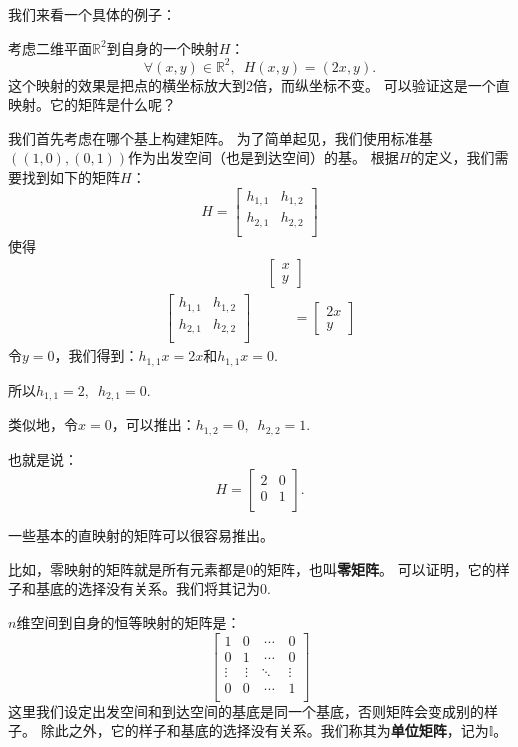 \documentclass[12pt,UTF8,fontset=none]{ctexbook}
\begin{document}
我们来看一个具体的例子：

考虑二维平面$\mathbb{R}^2$到自身的一个映射$H$：
$$ \forall (x, y) \in \mathbb{R}^2, \,\,\, H(x,y) = (2x, y).$$
这个映射的效果是把点的横坐标放大到2倍，而纵坐标不变。
可以验证这是一个直映射。它的矩阵是什么呢？

我们首先考虑在哪个基上构建矩阵。
为了简单起见，我们使用标准基$\left((1,0),(0,1)\right)$作为出发空间（也是到达空间）的基。
根据$H$的定义，我们需要找到如下的矩阵$H$：
$$
H = \begin{bmatrix}
    h_{1,1} & h_{1,2}  \\
    h_{2,1} & h_{2,2}  \\
  \end{bmatrix}
$$
使得
\begin{align*}
&  \,\begin{bmatrix}x\\y\end{bmatrix}  \\
    \begin{bmatrix}
         h_{1,1} & h_{1,2}  \\
         h_{2,1} & h_{2,2}  \\
       \end{bmatrix} \,&\qquad = \begin{bmatrix}2x\\y \end{bmatrix} 
\end{align*}
令$y = 0$，我们得到：$h_{1,1}x = 2x$和$h_{1,1}x = 0$.

所以$h_{1,1} = 2, \,\,\, h_{2,1} = 0.$

类似地，令$x = 0$，可以推出：$h_{1,2} = 0, \,\,\, h_{2,2} = 1.$

也就是说：
$$
H = \begin{bmatrix}
    2 & 0  \\
    0 & 1  \\
  \end{bmatrix}.
$$

一些基本的直映射的矩阵可以很容易推出。

比如，零映射的矩阵就是所有元素都是$0$的矩阵，也叫\textbf{零矩阵}。
可以证明，它的样子和基底的选择没有关系。我们将其记为$0$.

$n$维空间到自身的恒等映射的矩阵是：
$$
\begin{bmatrix}
 1     & 0  & \,\cdots \, & 0 \\
 0     & 1  & \,\cdots \,& 0 \\
 \vdots      & \,\vdots  \,  & \ddots & \vdots  \\
 0     & 0   & \,\cdots \,& 1 \\
\end{bmatrix}
$$
这里我们设定出发空间和到达空间的基底是同一个基底，否则矩阵会变成别的样子。
除此之外，它的样子和基底的选择没有关系。我们称其为\textbf{单位矩阵}，记为$\mathbb{I}$。
\end{document}
